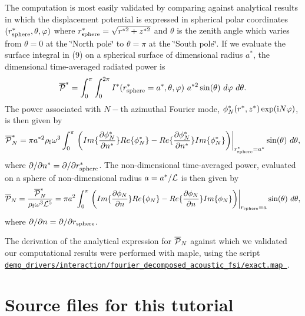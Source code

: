 The computation is most easily validated by comparing against analytical results in which the displacement potential is expressed in spherical polar coordinates $ (r_{\rm sphere}^*, \theta, \varphi) $ where $ r_{\rm sphere}^* = \sqrt{r^{*2} + z^{*2}} $ and $ \theta $ is the zenith angle which varies from $ \theta=0$ at the \char`\"{}\+North pole\char`\"{} to $ \theta=\pi $ at the \char`\"{}\+South pole\char`\"{}. If we evaluate the surface integral in (9) on a spherical surface of dimensional radius $ a^* $, the dimensional time-\/averaged radiated power is \[ \overline{\cal P }^* = \int_0^\pi \int_0^{2\pi} I^*(r_{\rm sphere}^*=a^*, \theta,\varphi)\ a^{*2} \sin(\theta) \ d\varphi \ d\theta. \] The power associated with $ N-$th azimuthal Fourier mode, $ \phi^*_N(r^*,z^*) \exp({\rm i}N \varphi) $, is then given by \[ \overline{\cal P }^*_N = \pi a^{*2} \rho_{\rm f} \omega^3 \int_0^\pi \left.\bigg( Im \{\frac{\partial \phi_N^*}{\partial n^*} \} Re\{\phi_N^* \} - Re \{\frac{\partial \phi_N^*}{\partial n^*} \} Im\{\phi_N^* \} \bigg)\right|_{r_{\rm sphere}^*=a^*} \sin(\theta) \ d\theta, \] where $ \partial / \partial n^* = \partial / \partial r_{\rm sphere}^* $. The non-\/dimensional time-\/averaged power, evaluated on a sphere of non-\/dimensional radius $ a = a^*/{\cal L}$ is then given by \[ \overline{\cal P }_N = \frac{\overline{\cal P }^*_N}{\rho_{\rm f} \omega^3 {\cal L}^5} = \pi a^2 \int_0^\pi \left. \bigg( Im \{\frac{\partial \phi_N}{\partial n} \} Re\{\phi_N \} - Re \{\frac{\partial \phi_N}{\partial n} \} Im\{\phi_N \} \bigg)\right|_{r_{\rm sphere}=a} \sin(\theta) \ d\theta, \] where $ \partial / \partial n = \partial / \partial r_{\rm sphere} $.

The derivation of the analytical expression for $ \overline{\cal P }_N $ against which we validated our computational results were performed with maple, using the script \href{../../../../demo_drivers/interaction/fourier_decomposed_acoustic_fsi/exact.map}{\tt demo\+\_\+drivers/interaction/fourier\+\_\+decomposed\+\_\+acoustic\+\_\+fsi/exact.\+map }. 

 

\hypertarget{index_sources}{}\section{Source files for this tutorial}\label{index_sources}

